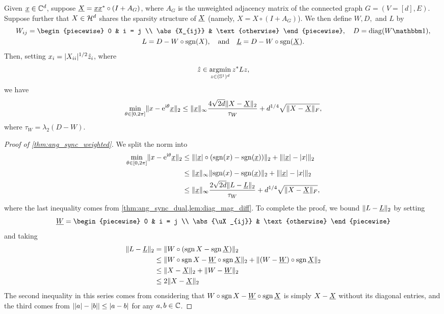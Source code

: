 \begin{corollary} \label{thm:ang_sync_weighted}
  Given $\underline{x} \in \mathbb{C}^d$, suppose $\underline{X} = \underline{x} \underline{x}^* \circ (I + A_G)$, where $A_G$ is the unweighted adjacency matrix of the connected graph $G = (V = [d], E)$.  Suppose further that $X \in \mathcal{H}^d$ shares the sparsity structure of $\underline{X}$ (namely, $X = X \circ (I + A_G)$).  We then define $W, D,$ and $L$ by \begin{gather*} W_{ij} = \begin{piecewise} 0 & i = j \\ \abs{X_{ij}} & \text{otherwise} \end{piecewise}, \quad D = \diag(W \one), \\ L = D - W \circ \sgn(X), \quad \text{and} \quad \uL = D - W \circ \sgn(\uX).\end{gather*}  Then, setting $x_i = |X_{ii}|^{1/2} \hat{z}_i$, where \[\hat{z} \in \operatorname*{argmin}_{z \in (\mathbb{S}^1)^d} z^* L z,\] we have \begin{equation} \min_{\theta \in [0, 2 \pi]} \lVert x - \mathrm{e}^{\mathrm{i} \theta} \underline{x}\rVert_2 \le \lVert\underline{x}\rVert_\infty \dfrac{4 \sqrt{2d} \lVert X - \underline{X}\rVert_2}{\tau_W} + d^{1 / 4} \sqrt{\lVert X - \underline{X}\rVert_F}, \label{eq:ang_sync_weighted}\end{equation} where $\tau_W = \lambda_2(D - W)$.
\end{corollary}

\begin{proof}[Proof of \cref{thm:ang_sync_weighted}]
  We split the norm into
  \begin{align*}
    \min_{\theta \in [0, 2\pi]} \lVert x - \mathrm{e}^{\mathrm{i} \theta} \underline{x}\rVert_2 &\le \lVert\lvert\underline{x}\rvert \circ (\operatorname{sgn}(x) - \operatorname{sgn}(\underline{x}))\rVert_2 + \lVert\lvert\underline{x}\rvert - \lvert x\rvert\rVert_2 \\
    &\le \lVert\underline{x}\rVert_\infty \lVert\operatorname{sgn}(x) - \operatorname{sgn}(\underline{x})\rVert_2 + \lVert\lvert\underline{x}\rvert - \lvert x\rvert\rVert_2 \\
    &\le \lVert\underline{x}\rVert_\infty \dfrac{2 \sqrt{2d} \lVert L - \underline{L}\rVert_2}{\tau_W} + d^{1 / 4} \sqrt{\lVert X - \underline{X}\rVert_F},
  \end{align*}
  where the last inequality comes from \cref{thm:ang_sync_dual,lem:diag_mag_diff}.  To complete the proof, we bound $\lVert L - \underline{L}\rVert_2$ by setting \[\uW = \begin{piecewise} 0 & i = j \\ \abs{\uX_{ij}} & \text{otherwise} \end{piecewise}\] and taking
  \begin{align*}
    \lVert L - \underline{L}\rVert_2 &= \lVert W \circ(\operatorname{sgn} X - \operatorname{sgn} \underline{X})\rVert_2 \\
    &\le \lVert W \circ \operatorname{sgn} X - \underline{W} \circ \operatorname{sgn} \underline{X}\rVert_2 + \lVert(W - \underline{W}) \circ \operatorname{sgn} \underline{X}\rVert_2 \\
    &\le \lVert X - \underline{X}\rVert_2 + \lVert W - \underline{W}\rVert_2 \\
    &\le 2 \lVert X - \underline{X}\rVert_2
  \end{align*}
  The second inequality in this series comes from considering that $W \circ \operatorname{sgn} X - \underline{W} \circ \operatorname{sgn} \underline{X}$ is simply $X - \underline{X}$ without its diagonal entries, and the third comes from $\lvert\lvert a\rvert - \lvert b\rvert\rvert \le \lvert a - b\rvert$ for any $a, b \in \mathbb{C}$.
\end{proof}

